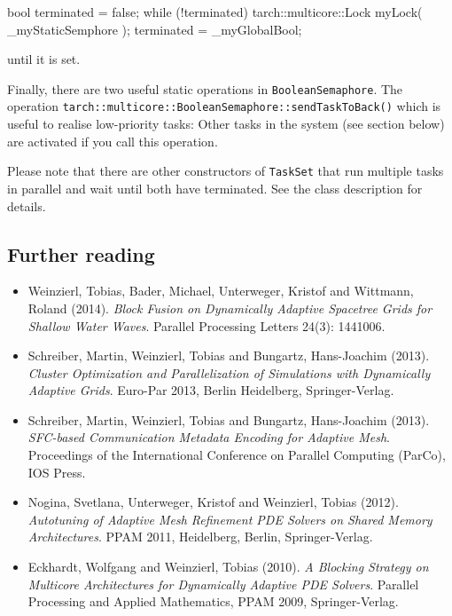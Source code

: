 \begin{code}
  bool terminated = false;
  while (!terminated) {
    tarch::multicore::Lock myLock( _myStaticSemphore );
    terminated = _myGlobalBool;
  }
\end{code}

\noindent
until it is set.

Finally, there are two useful static operations in \texttt{BooleanSemaphore}.
The operation \linebreak
\texttt{tarch::multicore::BooleanSemaphore::sendTaskToBack()}
which is useful to realise low-priority tasks: Other tasks in the system (see
section below) are activated if you call this operation.


Please note that there are other constructors of \texttt{TaskSet} that run
multiple tasks in parallel and wait until both have terminated. 
See the class description for details.



\subsection*{Further reading}

\begin{itemize}
  \item Weinzierl, Tobias, Bader, Michael, Unterweger, Kristof and Wittmann,
  Roland (2014). {\em Block Fusion on Dynamically Adaptive Spacetree Grids for
  Shallow Water Waves}. Parallel Processing Letters 24(3): 1441006.
  \item Schreiber, Martin, Weinzierl, Tobias and Bungartz, Hans-Joachim (2013).
  {\em Cluster Optimization and Parallelization of Simulations with Dynamically
  Adaptive Grids}. Euro-Par 2013, Berlin Heidelberg, Springer-Verlag.
  \item Schreiber, Martin, Weinzierl, Tobias and Bungartz, Hans-Joachim (2013).
  {\em SFC-based Communication Metadata Encoding for Adaptive Mesh}. Proceedings
  of the International Conference on Parallel Computing (ParCo), IOS Press.
  \item Nogina, Svetlana, Unterweger, Kristof and Weinzierl, Tobias (2012).
  {\em Autotuning of Adaptive Mesh Refinement PDE Solvers on Shared Memory
  Architectures}. PPAM 2011, Heidelberg, Berlin, Springer-Verlag.
  \item Eckhardt, Wolfgang and Weinzierl, Tobias (2010). {\em A Blocking
  Strategy on Multicore Architectures for Dynamically Adaptive PDE Solvers}.
  Parallel Processing and Applied Mathematics, PPAM 2009, Springer-Verlag.
\end{itemize}
